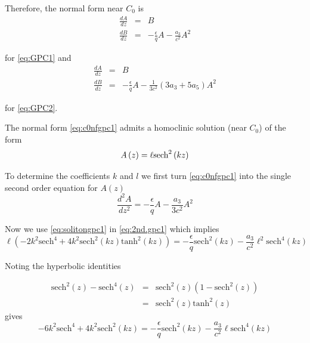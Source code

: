 Therefore, the normal form near $C_0$ is
\begin{subequations}\label{eq:c0nfgpc1}
\begin{eqnarray}
\frac{dA}{dz} &=& B \\
\frac{dB}{dz} &=& -\frac{\epsilon}{q} A - \frac{a_3}{ c^2} A^2
\end{eqnarray}
\end{subequations}

for \eqref{eq:GPC1} and
\begin{subequations}\label{eq:c0nfgpc2}
\begin{eqnarray}
\frac{dA}{dz} &=& B \\
\frac{dB}{dz} &=& -\frac{\epsilon}{q} A - \frac{1}{3 c^2} \left(3 a_3 + 5 a_5 \right) A^2
\end{eqnarray}
\end{subequations}

for \eqref{eq:GPC2}.

The normal form \eqref{eq:c0nfgpc1} admits a homoclinic solution (near $C_0$) of the form 
\begin{equation} \label{eq:solitongpc1}
A\left(z\right) = \ell \space \mathrm{sech}^2\left(k z\right)
\end{equation}

To determine the coefficients $k$ and $l$ we first turn \eqref{eq:c0nfgpc1} into the single
second order equation for $A(z)$
\begin{equation} \label{eq:2nd.gpc1}
\frac{d^2A}{dz^2} = -\frac{\epsilon}{q} A - \frac{a_3}{3 c^2} A^2
\end{equation}

Now we use \eqref{eq:solitongpc1} in \eqref{eq:2nd.gpc1} which implies
\begin{equation}\label{eq:hyperparty1}
\ell \left( -2 k^2 \mathrm{sech}^4 + 4 k^2 \mathrm{sech}^2\left(kz\right) \mathrm{tanh}^2\left(kz\right) \right) = - \frac{\epsilon}{q} \mathrm{sech}^2(kz) - \frac{a_3}{c^2} \ell^2 \mathrm{sech}^4(kz) 
\end{equation}

Noting the hyperbolic identities

\begin{subequations} 
\begin{eqnarray*}
\mathrm{sech}^2\left(z\right) - \mathrm{sech}^4\left(z\right) &=& \mathrm{sech}^2\left(z\right) \left(1 - \mathrm{sech}^2\left(z\right)\right) \\
 &=& \mathrm{sech}^2\left(z\right) \mathrm{tanh}^2\left(z\right)
\end{eqnarray*}
\end{subequations}
gives 
\begin{equation}\label{eq:hyper1}
-6 k^2 \mathrm{sech}^4 + 4 k^2 \mathrm{sech}^2\left(kz\right)  = - \frac{\epsilon}{q} \mathrm{sech}^2(kz) - \frac{a_3}{c^2} \ell \mathrm{sech}^4(kz) 
\end{equation}

